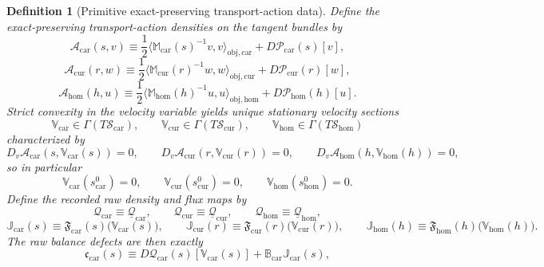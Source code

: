 \documentclass[11pt]{article}
\newcommand{\TensorStateManifold}{\mathcal S_{\mathrm{car}}}
\newcommand{\CurStateManifold}{\mathcal S_{\mathrm{cur}}}
\newcommand{\HomStateManifold}{\mathcal S_{\mathrm{hom}}}
\newcommand{\TensorStateBase}{s_{\mathrm{car}}^{0}}
\newcommand{\CurStateBase}{s_{\mathrm{cur}}^{0}}
\newcommand{\HomStateBase}{s_{\mathrm{hom}}^{0}}
\newcommand{\TensorRawDensity}{\boldsymbol{\mathcal Q}_{\mathrm{car}}}
\newcommand{\CurRawDensity}{\boldsymbol{\mathcal Q}_{\mathrm{cur}}}
\newcommand{\HomRawDensity}{\boldsymbol{\mathcal Q}_{\mathrm{hom}}}
\newcommand{\TensorTransport}{\mathbb V_{\mathrm{car}}}
\newcommand{\CurTransport}{\mathbb V_{\mathrm{cur}}}
\newcommand{\HomTransport}{\mathbb V_{\mathrm{hom}}}
\newcommand{\TensorFlux}{\mathbb J_{\mathrm{car}}}
\newcommand{\CurFlux}{\mathbb J_{\mathrm{cur}}}
\newcommand{\HomFlux}{\mathbb J_{\mathrm{hom}}}
\newcommand{\TensorDiv}{\mathbb B_{\mathrm{car}}}
\newcommand{\TensorRawBalance}{\boldsymbol{\mathfrak c}_{\mathrm{car}}}
\newcommand{\TensorObjDensity}{\underline{\mathcal Q}_{\mathrm{car}}}
\newcommand{\CurObjDensity}{\underline{\mathcal Q}_{\mathrm{cur}}}
\newcommand{\HomObjDensity}{\underline{\mathcal Q}_{\mathrm{hom}}}
\newcommand{\TensorMobility}{\mathbb M_{\mathrm{car}}}
\newcommand{\CurMobility}{\mathbb M_{\mathrm{cur}}}
\newcommand{\HomMobility}{\mathbb M_{\mathrm{hom}}}
\newcommand{\TensorDrive}{\mathcal P_{\mathrm{car}}}
\newcommand{\CurDrive}{\mathcal P_{\mathrm{cur}}}
\newcommand{\HomDrive}{\mathcal P_{\mathrm{hom}}}
\newcommand{\TensorActionDensity}{\mathscr A_{\mathrm{car}}}
\newcommand{\CurActionDensity}{\mathscr A_{\mathrm{cur}}}
\newcommand{\HomActionDensity}{\mathscr A_{\mathrm{hom}}}
\newcommand{\TensorFluxRead}{\mathfrak F_{\mathrm{car}}}
\newcommand{\CurFluxRead}{\mathfrak F_{\mathrm{cur}}}
\newcommand{\HomFluxRead}{\mathfrak F_{\mathrm{hom}}}
\newtheorem{definition}{Definition}
\begin{document}
\begin{definition}[Primitive exact-preserving transport-action data]
Define the exact-preserving transport-action densities on the tangent bundles by
\begin{equation}
\TensorActionDensity(s,v)
\equiv
\frac12\langle \TensorMobility(s)^{-1}v,v\rangle_{\mathrm{obj,car}}
+D\TensorDrive(s)[v],
\label{eq:transport_action_car}
\end{equation}
\begin{equation}
\CurActionDensity(r,w)
\equiv
\frac12\langle \CurMobility(r)^{-1}w,w\rangle_{\mathrm{obj,cur}}
+D\CurDrive(r)[w],
\label{eq:transport_action_cur}
\end{equation}
\begin{equation}
\HomActionDensity(h,u)
\equiv
\frac12\langle \HomMobility(h)^{-1}u,u\rangle_{\mathrm{obj,hom}}
+D\HomDrive(h)[u].
\label{eq:transport_action_hom}
\end{equation}
Strict convexity in the velocity variable yields unique stationary velocity sections
\[
\TensorTransport\in\Gamma(T\TensorStateManifold),\qquad
\CurTransport\in\Gamma(T\CurStateManifold),\qquad
\HomTransport\in\Gamma(T\HomStateManifold)
\]
characterized by
\begin{equation}
D_v\TensorActionDensity(s,\TensorTransport(s))=0,\qquad
D_v\CurActionDensity(r,\CurTransport(r))=0,\qquad
D_v\HomActionDensity(h,\HomTransport(h))=0,
\label{eq:stationary_transport}
\end{equation}
so in particular
\begin{equation}
\TensorTransport(\TensorStateBase)=0,\qquad
\CurTransport(\CurStateBase)=0,\qquad
\HomTransport(\HomStateBase)=0.
\label{eq:transport_base_zero}
\end{equation}
Define the recorded raw density and flux maps by
\begin{equation}
\TensorRawDensity\equiv\TensorObjDensity,\qquad
\CurRawDensity\equiv\CurObjDensity,\qquad
\HomRawDensity\equiv\HomObjDensity,
\label{eq:raw_density_from_action}
\end{equation}
\begin{equation}
\TensorFlux(s)\equiv\TensorFluxRead(s)\bigl(\TensorTransport(s)\bigr),\qquad
\CurFlux(r)\equiv\CurFluxRead(r)\bigl(\CurTransport(r)\bigr),\qquad
\HomFlux(h)\equiv\HomFluxRead(h)\bigl(\HomTransport(h)\bigr).
\label{eq:raw_flux_from_action}
\end{equation}
The raw balance defects are then exactly
\begin{equation}
\TensorRawBalance(s)
\equiv
D\TensorRawDensity(s)[\TensorTransport(s)]
+\TensorDiv\TensorFlux(s),
\label{eq:action_raw_balance_car}
\end{equation}

\end{definition}
\end{document}

